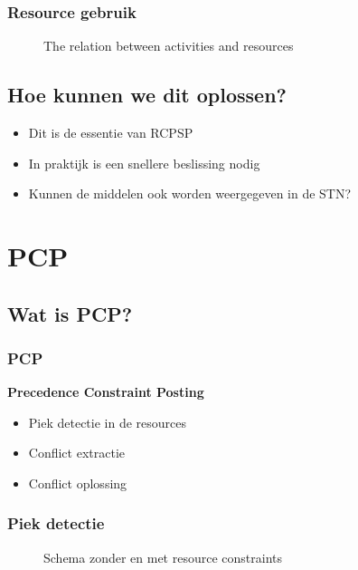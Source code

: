 \documentclass{beamer}
\theoremstyle{definition}
\newcommand{\inputtikz}[1]{}
\begin{document}
\begin{frame}
	\frametitle{Resource gebruik}
	\vspace{-.2em}
	\begin{figure}[ht]
		\makebox[\textwidth][c]{\resizebox{.7\paperwidth}{!}{
			\inputtikz{usage}
		}}
		\vspace{-1em}
		\caption{The relation between activities and resources}
		\label{fig:activity_graph}
	\end{figure}
\end{frame}

\subsection{Hoe kunnen we dit oplossen?}
\begin{frame}
	\begin{itemize}
		\item Dit is de essentie van RCPSP
		\item In praktijk is een snellere beslissing nodig
		\item Kunnen de middelen ook worden weergegeven in de STN?
	\end{itemize}
\end{frame}

\section{PCP}


\subsection{Wat is PCP?}
\begin{frame}
	\frametitle{PCP}
	\textbf{Precedence Constraint Posting}
	\begin{itemize}
		\item<2-> Piek detectie in de resources
		\item<3-> Conflict extractie
		\item<4-> Conflict oplossing
	\end{itemize}
\end{frame}

\begin{frame}
	\frametitle{Piek detectie}
	\vspace{-1.2em}
	\begin{figure}[ht]
		\makebox[\textwidth][c]{\resizebox{.36\paperwidth}{!}{
			\inputtikz{schedule_infeasible_colored_profile}
		}}
		\vspace{-1.3em}
		\caption{Schema zonder en met resource constraints}
	\end{figure}
\end{frame}
\end{document}
